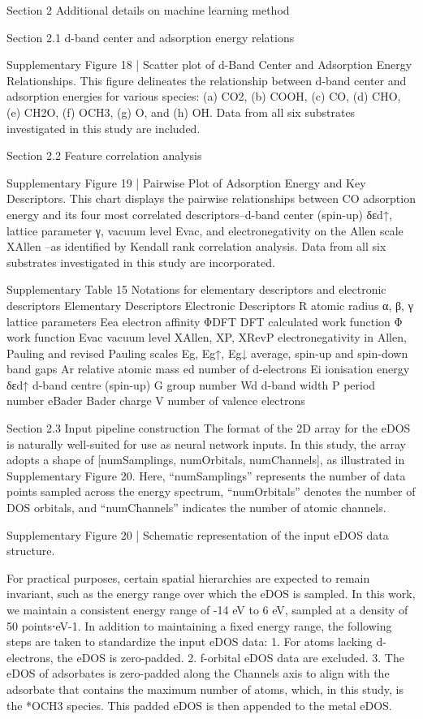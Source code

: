 Section 2 Additional details on machine learning method

Section 2.1 d-band center and adsorption energy relations


Supplementary Figure 18 | Scatter plot of d-Band Center and Adsorption Energy Relationships. This figure delineates the relationship between d-band center and adsorption energies for various species: (a) CO2, (b) COOH, (c) CO, (d) CHO, (e) CH2O, (f) OCH3, (g) O, and (h) OH. Data from all six substrates investigated in this study are included.


Section 2.2 Feature correlation analysis


Supplementary Figure 19 | Pairwise Plot of Adsorption Energy and Key Descriptors. This chart displays the pairwise relationships between CO adsorption energy and its four most correlated descriptors–d-band center (spin-up) δεd↑, lattice parameter γ, vacuum level Evac, and electronegativity on the Allen scale XAllen –as identified by Kendall rank correlation analysis. Data from all six substrates investigated in this study are incorporated.


Supplementary Table 15
Notations for elementary descriptors and electronic descriptors
Elementary Descriptors	Electronic Descriptors
R	atomic radius	α, β, γ	lattice parameters
Eea	electron affinity	ΦDFT	DFT calculated work function
Φ	work function	Evac	vacuum level
XAllen, ΧP, ΧRevP	electronegativity in Allen, Pauling and revised Pauling scales	Eg, Eg↑, Eg↓	average, spin-up and spin-down band gaps
Ar	relative atomic mass	ed	number of d-electrons
Ei	ionisation energy	δεd↑	d-band centre (spin-up)
G	group number	Wd	d-band width
P	period number	eBader	Bader charge
V	number of valence electrons


Section 2.3 Input pipeline construction
The format of the 2D array for the eDOS is naturally well-suited for use as neural network inputs. In this study, the array adopts a shape of [numSamplings, numOrbitals, numChannels], as illustrated in Supplementary Figure 20. Here, “numSamplings” represents the number of data points sampled across the energy spectrum, “numOrbitals” denotes the number of DOS orbitals, and “numChannels” indicates the number of atomic channels.


Supplementary Figure 20 | Schematic representation of the input eDOS data structure.

For practical purposes, certain spatial hierarchies are expected to remain invariant, such as the energy range over which the eDOS is sampled. In this work, we maintain a consistent energy range of -14 eV to 6 eV, sampled at a density of 50 points⋅eV-1. In addition to maintaining a fixed energy range, the following steps are taken to standardize the input eDOS data:
1.	For atoms lacking d-electrons, the eDOS is zero-padded.
2.	f-orbital eDOS data are excluded.
3.	The eDOS of adsorbates is zero-padded along the Channels axis to align with the adsorbate that contains the maximum number of atoms, which, in this study, is the *OCH3 species. This padded eDOS is then appended to the metal eDOS.

